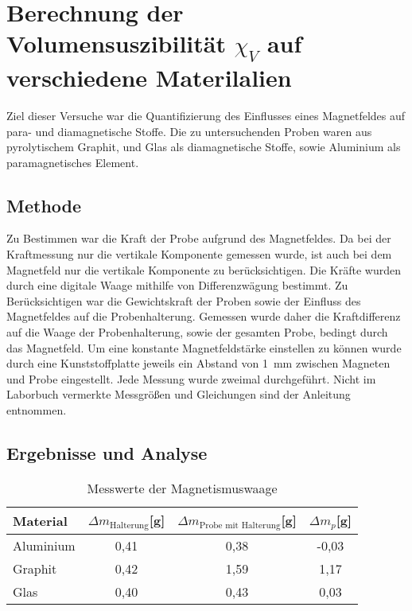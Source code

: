 
\section[Volumensuzebilität $\chi_V$]{Berechnung der Volumensuszibilität $\chi_V$ auf verschiedene Materilalien}
Ziel dieser Versuche war die Quantifizierung des Einflusses eines Magnetfeldes auf para- und diamagnetische Stoffe. Die zu untersuchenden Proben waren aus pyrolytischem Graphit, und Glas als diamagnetische Stoffe, sowie Aluminium als paramagnetisches Element.\\
\subsection{Methode}
Zu Bestimmen war die Kraft der Probe aufgrund des Magnetfeldes. Da bei der Kraftmessung nur die vertikale Komponente gemessen wurde, ist auch bei dem Magnetfeld nur die vertikale Komponente zu berücksichtigen. Die Kräfte wurden durch eine digitale Waage mithilfe von Differenzwägung bestimmt.
 Zu Berücksichtigen war die Gewichtskraft der Proben sowie der Einfluss des Magnetfeldes auf die Probenhalterung.
 Gemessen wurde daher die Kraftdifferenz auf die Waage der Probenhalterung, sowie der gesamten Probe, bedingt durch das Magnetfeld.
Um eine konstante Magnetfeldstärke einstellen zu können wurde durch eine Kunststoffplatte jeweils ein Abstand von \SI{1}{mm} zwischen Magneten und Probe eingestellt. Jede Messung wurde zweimal durchgeführt. Nicht im Laborbuch vermerkte Messgrößen und Gleichungen sind der Anleitung entnommen. 

\subsection{Ergebnisse und Analyse}


\begin{table}[h]

\caption{Messwerte der Magnetismuswaage}
\begin{center}
\begin{tabular}{|l|c|c|c|}

\hline
Material&$\Delta m_{\textrm{Halterung}}$[g]&$\Delta m_{\textrm{Probe mit Halterung}}$[g] &$\Delta m_p$[g]\\
\hline
Aluminium &0,41&0,38&-0,03\\
\hline
Graphit&0,42&1,59&1,17
\\ \hline
Glas&0,40&0,43&0,03
\\ \hline

\end{tabular}
\end{center}
\label{vsus}

\end{table}


